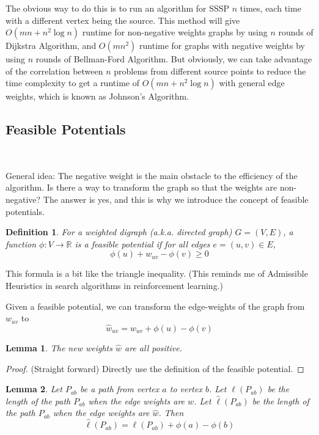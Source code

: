\documentclass[11pt]{article}
\theoremstyle{plain}
\newtheorem{lemma}{Lemma}[section]
\newtheorem{definition}{Definition}[section]
\begin{document}
  The obvious way to do this is to run an algorithm for SSSP $n$ times,
  each time with a different vertex being the source. This method will give $O(mn + n^{2} \log n)$
  runtime for non-negative weights graphs by using $n$ rounds of Dijkstra Algorithm, and $O(mn^{2})$ 
  runtime for graphs with negative weights by using $n$ rounds of Bellman-Ford Algorithm. But obviously, 
  we can take advantage of the correlation between $n$ problems from different source points to reduce 
  the time complexity to get a runtime of $O(mn + n^{2} \log n)$ with general edge weights, which is 
  known as Johnson's Algorithm.

\subsection{Feasible Potentials}\

  General idea: The negative weight is the main obstacle to the efficiency of the algorithm. Is there a way to
  transform the graph so that the weights are non-negative? The answer is yes, and this is why we introduce the
  concept of feasible potentials.

  \begin{definition}
    For a weighted digraph (a.k.a. directed graph) $G = (V, E)$, a function $\phi: V \rightarrow \mathbb{R}$ is
    a feasible potential if for all edges $e=(u, v) \in E$, 
    \[
      \phi(u) + w_{uv} - \phi(v) \geq 0
    \]
  \end{definition}

  This formula is a bit like the triangle inequality. (This reminds me of Admissible Heuristics in search algorithms 
  in reinforcement learning.) 

  Given a feasible potential, we can transform the edge-weights of the graph from $w_{uv}$ to 
  \[
    \hat w_{uv} = w_{uv} + \phi(u) - \phi(v)
  \]

  \begin{lemma}
    The new weights $\hat w$ are all positive.
  \end{lemma}

  \begin{proof}
    (Straight forward) Directly use the definition of the feasible potential.
  \end{proof}

  \begin{lemma}
    Let $P_{ab}$ be a path from vertex $a$ to vertex $b$. Let $\ell(P_{ab})$ be the length of the path $P_{ab}$
    when the edge weights are $w$. Let $\hat \ell(P_{ab})$ be the length of the path $P_{ab}$ when the edge weights
    are $\hat w$. Then 
    \[
      \hat \ell(P_{ab}) = \ell(P_{ab}) + \phi(a) - \phi(b)
    \]
  \end{lemma}
\end{document}
